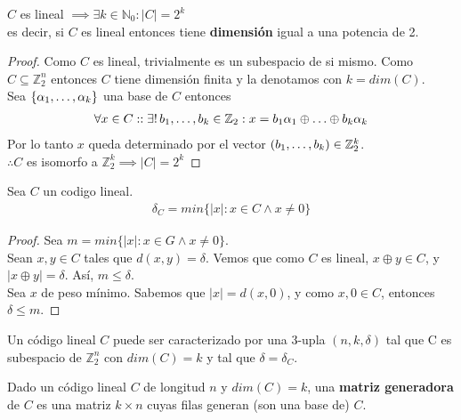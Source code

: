 \begin{proposition}
$C$ es lineal $\implies \exists k \in \mathbb{N}_0 : \left|C\right| = 2^k$\\
es decir, si $C$ es lineal entonces tiene \textbf{dimensión} igual a una potencia de 2.
\end{proposition}
\begin{proof}
Como $C$ es lineal, trivialmente es un subespacio de si mismo. Como $C \subseteq \mathbb{Z}_2^n$ entonces $C$ tiene dimensión finita y la denotamos con $k = dim(C)$.\\
Sea $\{\alpha_1, \mathellipsis, \alpha_k\}$ una base de $C$ entonces
\begin{align}
    \forall x\in C :: \exists!\,b_1, \mathellipsis, b_k \in \mathbb{Z}_2 : x = b_1\alpha_1 \oplus \mathellipsis \oplus b_k \alpha_k
\end{align}
Por lo tanto $x$ queda determinado por el vector $(b_1, \mathellipsis, b_k) \in \mathbb{Z}_2^k$.\\
$\therefore C$ es isomorfo a $\mathbb{Z}_2^k \implies |C| = 2^k$
\end{proof}

\begin{proposition}
Sea $C$ un codigo lineal.
\begin{align}
\delta_C = min\{\left|x\right| : x\in C \wedge x \neq 0\}
\end{align}
\end{proposition}
\begin{proof}
Sea $m = min\{\left|x\right| : x\in G \wedge x \neq 0\}$.\\
Sean $x,y \in C$ tales que $d(x,y) = \delta$. Vemos que como $C$ es lineal, $x \oplus y \in C$, y $\left| x \oplus y \right| = \delta$. Así, $m \le \delta$.\\
 Sea $x$ de peso mínimo. Sabemos que $\left|x\right| = d(x,0)$, y como $x,0 \in C$, entonces $\delta \le m$.
\end{proof}

\begin{definition}
Un código lineal $C$ puede ser caracterizado por una 3-upla $(n, k, \delta)$ tal que C es subespacio de $\mathbb{Z}_2^n$ con $dim(C) = k$ y tal que $\delta = \delta_C$.
\end{definition}

\begin{definition}
Dado un código lineal $C$ de longitud $n$ y $dim(C) = k$, una \textbf{matriz generadora} de $C$ es una matriz $k \times n$ cuyas filas generan (son una base de) $C$.\\
\end{definition}

